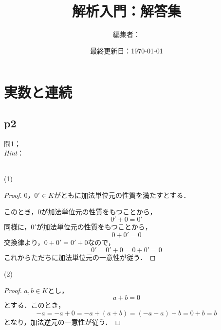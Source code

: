 \documentclass[dvipdfmx,uplatex,11pt]{jsarticle}
\title{解析入門：解答集}
\author{編集者：}
\date{最終更新日：\today}
\begin{document}
\maketitle
\tableofcontents
\newpage
%
\section{実数と連続}
%
\subsection{p2}
%
問1；\\
\textsl{Hint}：\\
\dotfill
%
\\
\begin{itembox}[c]{(1)}
    \begin{proof}
$0，0' \in K$がともに加法単位元の性質を満たすとする．\par 
このとき，$0$が加法単位元の性質をもつことから，
\[
    0'+0=0'
\]
同様に，$0'$が加法単位元の性質をもつことから，
\[
    0+0' = 0
\]
交換律より，$0+0'=0'+0$なので，
\[
    0'=0'+0 =0+0' =0
\]
これからただちに加法単位元の一意性が従う．
    \end{proof}
    \end{itembox}
    \begin{itembox}[c]{(2)}
        \begin{proof}
$a ,b \in K$とし，
\[
    a+b =0
\]
とする．このとき，
\[
    -a = -a+0 = -a +(a+b)=(-a+a)+b =0+b = b
\]
となり，加法逆元の一意性が従う．
        \end{proof}
    \end{itembox}
\end{document}
